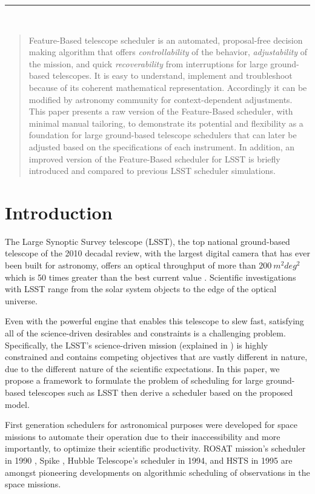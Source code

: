 \documentclass[12pt]{aastex62}
\theoremstyle{definition}
\begin{document}
\noindent\rule{\textwidth}{0.4pt}\\
\newpage

\begin{abstract}

Feature-Based telescope scheduler is an automated, proposal-free decision making algorithm that offers \textit{controllability} of the behavior, \textit{adjustability} of the mission, and quick \textit{recoverability} from interruptions for large ground-based telescopes. It is easy to understand, implement and troubleshoot because of its coherent mathematical representation. Accordingly it can be modified by astronomy community for context-dependent adjustments. This paper presents a raw version of the Feature-Based scheduler, with minimal manual tailoring, to demonstrate its potential and flexibility as a foundation for large ground-based telescope schedulers that can later be adjusted based on the specifications of each instrument. In addition, an improved version of the Feature-Based scheduler for LSST is briefly introduced and compared to previous LSST scheduler simulations.
\end{abstract}

\section{Introduction}

The Large Synoptic Survey telescope (LSST), the top national ground-based telescope of the 2010 decadal review, with the largest digital camera that has ever been built for astronomy, offers an optical throughput of more than $200~m^2 deg^2$ which is 50 times greater than the best current value \citep{tyson2002large}. Scientific investigations with LSST range from the solar system objects to the edge of the optical universe. 

Even with the powerful engine that enables this telescope to slew fast, satisfying all of the science-driven desirables and constraints is a challenging problem. Specifically, the LSST's science-driven mission (explained in \citep{ivezic2008large}) is highly constrained and contains competing objectives that are vastly different in nature, due to the different nature of the scientific expectations. In this paper, we propose a framework to formulate the problem of scheduling for large ground-based telescopes such as LSST then derive a scheduler based on the proposed model.

First generation schedulers for astronomical purposes were developed for space missions to automate their operation due to their inaccessibility and more importantly, to optimize their scientific productivity. ROSAT mission's scheduler in 1990 \citep{nowakovski1999using},  Spike \citep{johnston1994spike}, Hubble Telescope's scheduler in 1994, and HSTS \citep{muscettola1995automating} in 1995 are amongst pioneering developments on algorithmic scheduling of observations in the space missions. 
\end{document}
